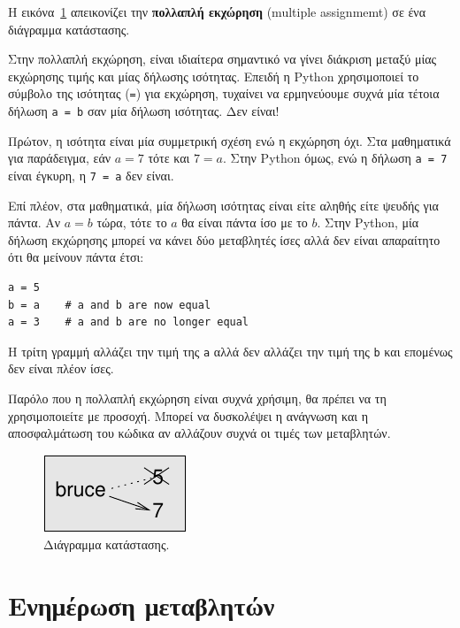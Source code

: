 \documentclass[10pt]{book}
\begin{document}
Η εικόνα~\ref{fig.assign2} απεικονίζει την {\bf πολλαπλή
εκχώρηση} (multiple assignmemt) σε ένα διάγραμμα κατάστασης.
 

Στην πολλαπλή εκχώρηση, είναι ιδιαίτερα σημαντικό να γίνει διάκριση
μεταξύ μίας εκχώρησης τιμής και μίας δήλωσης ισότητας. Επειδή η
Python χρησιμοποιεί το σύμβολο της ισότητας ({\tt =}) για
εκχώρηση, τυχαίνει να ερμηνεύουμε συχνά μία τέτοια δήλωση {\tt a = b}
σαν μία δήλωση ισότητας. Δεν είναι!

Πρώτον, η ισότητα είναι μία συμμετρική σχέση ενώ η εκχώρηση όχι. Στα
μαθηματικά για παράδειγμα, εάν $a=7$ τότε και $7=a$. 
Στην Python όμως, ενώ η δήλωση {\tt a = 7} είναι έγκυρη,
η {\tt 7 = a} δεν είναι.

Επί πλέον, στα μαθηματικά, μία δήλωση ισότητας είναι είτε αληθής είτε
ψευδής για πάντα. Αν $a=b$ τώρα, τότε το $a$ θα είναι
πάντα ίσο με το $b$. Στην Python, μία δήλωση εκχώρησης
μπορεί να κάνει δύο μεταβλητές ίσες αλλά δεν είναι απαραίτητο 
ότι θα μείνουν πάντα έτσι:

\begin{verbatim}
a = 5
b = a    # a and b are now equal
a = 3    # a and b are no longer equal
\end{verbatim}
%

Η τρίτη γραμμή αλλάζει την τιμή της {\tt a} αλλά δεν αλλάζει
την τιμή της {\tt b} και επομένως δεν είναι πλέον ίσες.

Παρόλο που η πολλαπλή εκχώρηση είναι συχνά χρήσιμη, θα πρέπει να τη
χρησιμοποιείτε με προσοχή. Μπορεί να δυσκολέψει η ανάγνωση και η αποσφαλμάτωση του κώδικα αν αλλάζουν συχνά οι τιμές των μεταβλητών.

\begin{figure}
\centerline
{\includegraphics[scale=0.8]{figs/assign2.pdf}}
\caption{Διάγραμμα κατάστασης.}
\label{fig.assign2}
\end{figure}


\section{Ενημέρωση μεταβλητών}
\label{update}

\end{document}
